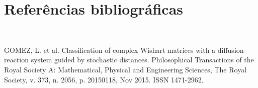 \documentclass[12pt,letterpaper]{article}
\begin{document}

\newpage
\section*{\centering \textbf{\LARGE{Referências bibliográficas}}}
\hrulefill \\

\nocite{*}


GOMEZ, L. et al. Classification of complex Wishart matrices with a diffusion-reaction system guided by
stochastic distances. Philosophical Transactions of the Royal Society A: Mathematical, Physical and Engineering
Sciences, The Royal Society, v. 373, n. 2056, p. 20150118, Nov 2015. ISSN 1471-2962. 
\end{document}
